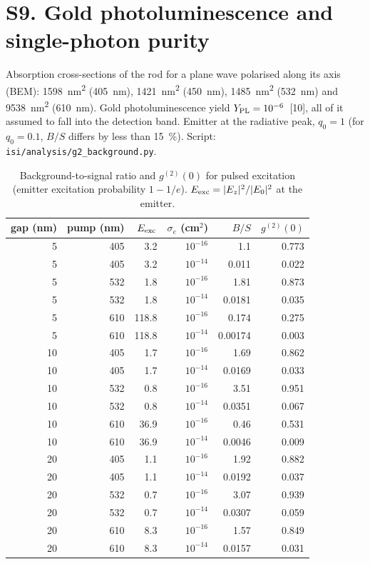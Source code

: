 \documentclass[11pt,a4paper]{article}
\begin{document}
\sloppy
\section*{S9. Gold photoluminescence and single-photon purity}
Absorption cross-sections of the rod for a plane wave polarised along its axis (BEM): \SI{1598}{nm^2} (\SI{405}{nm}),
\SI{1421}{nm^2} (\SI{450}{nm}), \SI{1485}{nm^2} (\SI{532}{nm}) and \SI{9538}{nm^2} (\SI{610}{nm}). Gold
photoluminescence yield $Y_{\rm PL}=10^{-6}$~[10], all of it assumed to fall into the detection band. Emitter at
the radiative peak, $q_0=1$ (for $q_0=0.1$, $B/S$ differs by less than \SI{15}{\percent}).
Script: \texttt{isi/analysis/g2\_background.py}.

\begin{table}[h]\centering\small
\caption{Background-to-signal ratio and $g^{(2)}(0)$ for pulsed excitation (emitter excitation probability $1-1/e$).
$E_{\rm exc}=|E_z|^2/|E_0|^2$ at the emitter.}\label{tab:g2}
\begin{tabular}{rrrrrr}\toprule
gap (nm) & pump (nm) & $E_{\rm exc}$ & $\sigma_e$ (cm$^2$) & $B/S$ & $g^{(2)}(0)$\\\midrule
5 & 405 & 3.2 & $10^{-16}$ & 1.1 & 0.773\\
5 & 405 & 3.2 & $10^{-14}$ & 0.011 & 0.022\\
5 & 532 & 1.8 & $10^{-16}$ & 1.81 & 0.873\\
5 & 532 & 1.8 & $10^{-14}$ & 0.0181 & 0.035\\
5 & 610 & 118.8 & $10^{-16}$ & 0.174 & 0.275\\
5 & 610 & 118.8 & $10^{-14}$ & 0.00174 & 0.003\\
10 & 405 & 1.7 & $10^{-16}$ & 1.69 & 0.862\\
10 & 405 & 1.7 & $10^{-14}$ & 0.0169 & 0.033\\
10 & 532 & 0.8 & $10^{-16}$ & 3.51 & 0.951\\
10 & 532 & 0.8 & $10^{-14}$ & 0.0351 & 0.067\\
10 & 610 & 36.9 & $10^{-16}$ & 0.46 & 0.531\\
10 & 610 & 36.9 & $10^{-14}$ & 0.0046 & 0.009\\
20 & 405 & 1.1 & $10^{-16}$ & 1.92 & 0.882\\
20 & 405 & 1.1 & $10^{-14}$ & 0.0192 & 0.037\\
20 & 532 & 0.7 & $10^{-16}$ & 3.07 & 0.939\\
20 & 532 & 0.7 & $10^{-14}$ & 0.0307 & 0.059\\
20 & 610 & 8.3 & $10^{-16}$ & 1.57 & 0.849\\
20 & 610 & 8.3 & $10^{-14}$ & 0.0157 & 0.031\\
\bottomrule\end{tabular}\end{table}
\end{document}
